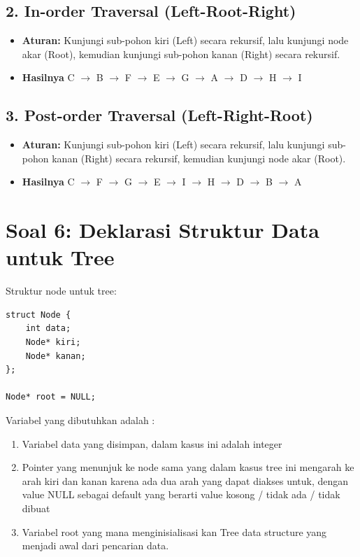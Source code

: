 \documentclass[12pt,a4paper]{article}
\begin{document}
\subsection*{2. In-order Traversal (Left-Root-Right)}
\begin{itemize}
    \item \textbf{Aturan:} Kunjungi sub-pohon kiri (Left) secara rekursif, lalu kunjungi node akar (Root), kemudian kunjungi sub-pohon kanan (Right) secara rekursif.
    \item \textbf{Hasilnya} C $\rightarrow$ B $\rightarrow$ F $\rightarrow$ E $\rightarrow$ G $\rightarrow$ A $\rightarrow$ D $\rightarrow$ H $\rightarrow$ I
\end{itemize}

\subsection*{3. Post-order Traversal (Left-Right-Root)}
\begin{itemize}
    \item \textbf{Aturan:} Kunjungi sub-pohon kiri (Left) secara rekursif, lalu kunjungi sub-pohon kanan (Right) secara rekursif, kemudian kunjungi node akar (Root).
    \item \textbf{Hasilnya} C $\rightarrow$ F $\rightarrow$ G $\rightarrow$ E $\rightarrow$ I $\rightarrow$ H $\rightarrow$ D $\rightarrow$ B $\rightarrow$ A
\end{itemize}

    


\vspace{1cm}

\section{Soal 6: Deklarasi Struktur Data untuk Tree}

Struktur node untuk tree:

\begin{verbatim}
struct Node {
    int data;
    Node* kiri;
    Node* kanan;
};

Node* root = NULL;
\end{verbatim}


Variabel yang dibutuhkan adalah : \\ 
\begin{enumerate}
  \item Variabel data yang disimpan, dalam kasus ini adalah integer 
  \item Pointer yang menunjuk ke node sama yang dalam kasus tree ini mengarah ke arah kiri dan kanan karena ada dua arah yang dapat diakses untuk, dengan value NULL sebagai default yang berarti value kosong / tidak ada / tidak dibuat
  \item Variabel root yang mana menginisialisasi kan Tree data structure yang menjadi awal dari pencarian data.
\end{enumerate}
\vspace{1cm}
\end{document}

